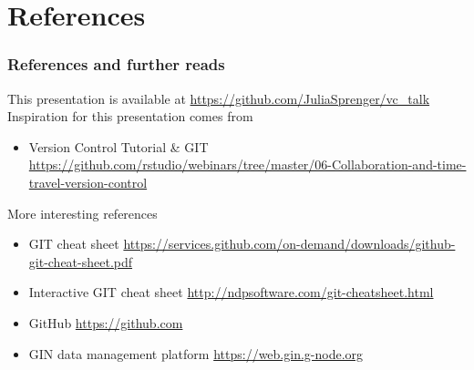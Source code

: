 \documentclass[
t, %
10pt, %
aspectratio=1610, %
ngerman,
english,
]{beamer}
\begin{document}
\section{References}
\begin{frame}
    \frametitle{References and further reads}
    This presentation is available at \url{https://github.com/JuliaSprenger/vc_talk}\\
    
    Inspiration for this presentation comes from
    \begin{itemize}
        \item Version Control Tutorial \& GIT \newline \url{https://github.com/rstudio/webinars/tree/master/06-Collaboration-and-time-travel-version-control}
    \end{itemize}
    More interesting references
    \begin{itemize}
        \item GIT cheat sheet \url{https://services.github.com/on-demand/downloads/github-git-cheat-sheet.pdf}
        \item Interactive GIT cheat sheet \url{http://ndpsoftware.com/git-cheatsheet.html}
        \item GitHub \url{https://github.com}
        \item GIN data management platform \url{https://web.gin.g-node.org}
    \end{itemize}
\end{frame}
\end{document}
